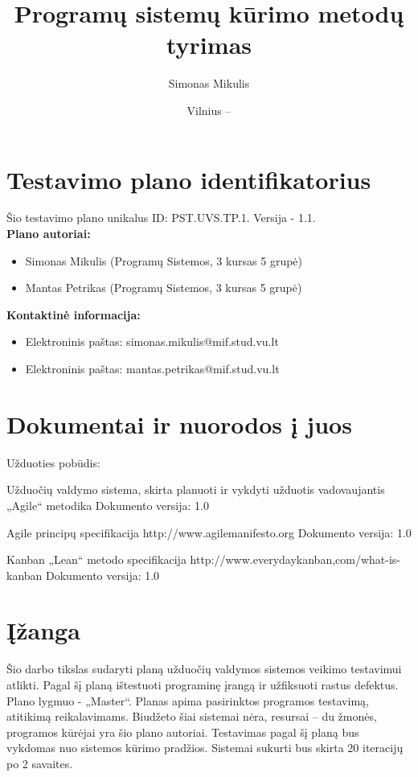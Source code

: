 \documentclass{VUMIFPSkursinis}
\title{Programų sistemų kūrimo metodų tyrimas}
\author{Simonas Mikulis}
\date{Vilnius – \the\year}
\begin{document}
      \maketitle
    
      \tableofcontents
  
    \section{Testavimo plano identifikatorius}
    
    Šio testavimo plano unikalus ID: PST.UVS.TP.1. Versija - 1.1.\\
    
    \textbf{Plano autoriai:} 
    \begin{itemize}[label={}]
      \item Simonas Mikulis (Programų Sistemos, 3 kursas 5 grupė)
      \item Mantas Petrikas (Programų Sistemos, 3 kursas 5 grupė)
    \end{itemize}
    
    \textbf{Kontaktinė informacija:}
    \begin{itemize}[label={}]
      \item Elektroninis paštas: simonas.mikulis@mif.stud.vu.lt
      \item Elektroninis paštas: mantas.petrikas@mif.stud.vu.lt
    \end{itemize}
    
    
    \section{Dokumentai ir nuorodos į juos}
    
    Užduoties pobūdis:
    
    Užduočių valdymo sistema, skirta planuoti ir vykdyti užduotis vadovaujantis „Agile“ metodika
    Dokumento versija: 1.0
    
    Agile principų specifikacija
    http://www.agilemanifesto.org
    Dokumento versija: 1.0
    
    Kanban „Lean“ metodo specifikacija
    http://www.everydaykanban,com/what-is-kanban
    Dokumento versija: 1.0
    
    
    \section{Įžanga}
    
    Šio darbo tikslas sudaryti planą užduočių valdymos sistemos veikimo testavimui atlikti.
    Pagal šį planą ištestuoti programinę įrangą ir užfiksuoti rastus defektus.
    Plano lygmuo - „Master“. Planas apima pasirinktos programos testavimą, atitikimą reikalavimams. 
    Biudžeto šiai sistemai nėra, resursai – du žmonės, programos kūrėjai yra šio plano autoriai. 
    Testavimas pagal šį planą bus vykdomas nuo sistemos kūrimo pradžios. Sistemai sukurti bus skirta 20 iteracijų po 2 savaites.
    
\end{document}
